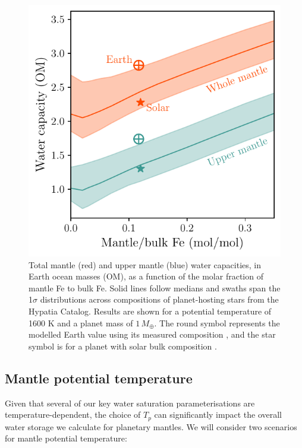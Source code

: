 \documentclass[fleqn,usenatbib]{mnras}
\begin{document}
\begin{figure}
    \centering
    \includegraphics[width=0.9\columnwidth]{x_Fe_dependence.pdf}
    \caption{Total mantle (red) and upper mantle (blue) water capacities, in Earth ocean masses (OM), as a function of the molar fraction of mantle Fe to bulk Fe. Solid lines follow medians and swaths span the 1$\sigma$ distributions across compositions of planet-hosting stars from the Hypatia Catalog. Results are shown for a potential temperature of 1600 K and a planet mass of $1\,M_\oplus$. The round symbol represents the modelled Earth value using its measured composition \citep{mcdonough_composition_1995}, and the star symbol is for a planet with solar bulk composition \citep{lodders_abundances_2009}.}
    \label{fig:x_Fe_dependence}
\end{figure}





\subsection{Mantle potential temperature}\label{sec:methods_temperature}

Given that several of our key water saturation parameterisations are temperature-dependent, the choice of $T_p$ can significantly impact the overall water storage we calculate for planetary mantles. We will consider two scenarios for mantle potential temperature:
\end{document}
